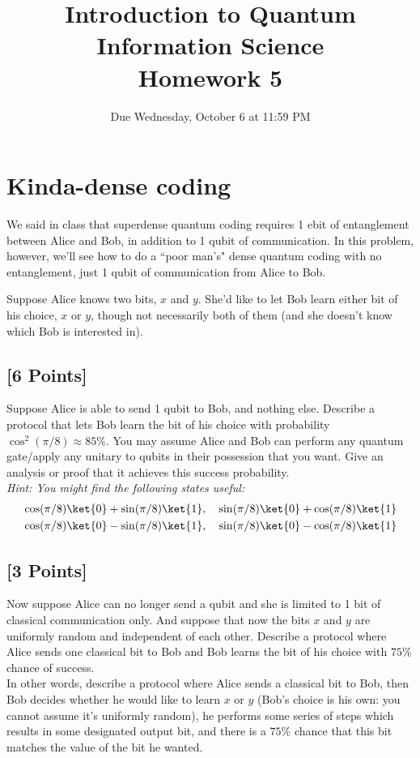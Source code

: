 \documentclass[11pt]{article}
\providecommand{\due}{Due Wednesday, October 6 at 11:59 PM}
\begin{document}
\title{Introduction to Quantum Information Science\\Homework 5}
\date{\due}

\maketitle

\section{Kinda-dense coding} We said in class that superdense quantum coding requires 1 ebit of
entanglement between Alice and Bob, in addition to 1 qubit of
communication.  In this problem, however, we'll see how to do a ``poor
man's" dense quantum coding with no entanglement, just 1 qubit of
communication from Alice to Bob.

Suppose Alice knows two bits, $x$ and $y$.  She'd like to let Bob learn either bit of his choice, $x$ or
$y$, though not necessarily both of them (and she doesn't know which Bob
is interested in).


\subsection{[6 Points]} 
Suppose Alice is able to send 1 qubit to Bob, and nothing else.
Describe a protocol that lets Bob learn the bit of his choice with
probability $\cos^2(\pi/8) \approx 85\%$. You may assume Alice and Bob can perform any quantum gate/apply any unitary to qubits in their possession that you want.
Give an analysis or proof that it achieves this success probability.
\\ \textit{Hint: You might find the following states useful:}
\begin{gather*}
\cos(\pi/8)\ket{0}+\sin(\pi/8)\ket{1},\quad \sin(\pi/8)\ket{0}+\cos(\pi/8)\ket{1}\\
\cos(\pi/8)\ket{0}-\sin(\pi/8)\ket{1},\quad \sin(\pi/8)\ket{0}-\cos(\pi/8)\ket{1}
\end{gather*}



\subsection{[3 Points]} Now suppose Alice can no longer send a qubit and she is limited to 1 bit of classical communication only. And
suppose that now the bits $x$ and $y$ are uniformly random and independent of each other.  
Describe a protocol where Alice sends one classical bit to Bob and Bob learns the bit of his choice with $75\%$ chance of success.
\\ In other words, describe a protocol where Alice sends a classical bit to Bob, then Bob decides whether he would like to learn $x$ or $y$ (Bob's choice is his own: you cannot assume it's uniformly random), he performs some series of steps which results in some designated output bit, and there is a $75\%$ chance that this bit matches the value of the bit he wanted.
\end{document}
